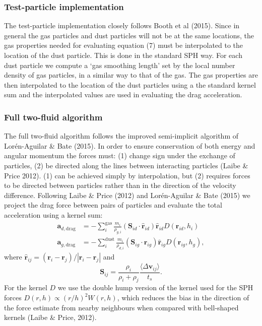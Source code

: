 \documentclass[a4paper]{article}
\renewcommand{\vec}[1]{\ensuremath{\mathbf{#1}}}
\begin{document}
\subsubsection{Test-particle implementation}

The test-particle implementation closely follows Booth et al (2015). Since in general the gas particles and dust particles will not be at the same locations, the gas properties needed for evaluating equation (7) must be interpolated to the location of the dust particle. This is done in the standard SPH way. For each dust particle we compute a `gas smoothing length' set by the local number density of gas particles, in a similar way to that of the gas. The gas properties are then interpolated to the location of the dust particles using a the standard kernel sum and the interpolated values are used in evaluating the drag acceleration.

\subsubsection{Full two-fluid algorithm}

The full two-fluid algorithm follows the improved semi-implicit algorithm of Lor\'en-Aguilar \& Bate (2015). In order to ensure conservation of both energy and angular momentum the forces must: (1) change sign under the exchange of particles, (2) be directed along the lines between interacting particles (Laibe \& Price 2012). (1) can be achieved simply by interpolation, but (2) requires forces to be directed between particles rather than in the direction of the velocity difference. Following Laibe \& Price (2012) and Lor\'en-Aguilar \& Bate (2015) we project the drag force between pairs of particles and evaluate the total acceleration using a kernel sum:
\begin{align*}
 \vec{a}_{d,\mathrm{drag}} &= - \sum_i^\mathrm{gas} \frac{m_i}{\rho_{g,i}} ( \vec{S}_{id}  \cdot \vec{\hat r}_{id}) \vec{\hat r}_{id} D(\vec{r}_{id}, h_i) \\
 \vec{a}_{g,\mathrm{drag}} &= - \sum_i^\mathrm{dust} \frac{m_i}{\rho_{d,i}} ( \vec{S}_{ig} \cdot \vec{\hat r}_{ig}) \vec{\hat r}_{ig} D(\vec{r}_{ig}, h_g),
\end{align*}
where $\vec{\hat r}_{ij} = (\vec{r}_i - \vec{r}_j) / |\vec{r}_i - \vec{r}_j|$ and 
\begin{equation}
 \vec{S}_{ij} = \frac{\rho_i}{\rho_i + \rho_j} \frac{\langle \Delta \vec{v}_{ij} \rangle}{t_s}.
\end{equation}
For the kernel $D$ we use the double hump version of the kernel used for the SPH forces $D(r,h) \propto (r/h)^2 W(r,h)$, which reduces the bias in the direction of the force estimate from nearby neighbours when compared with bell-shaped kernels (Laibe \& Price, 2012).
\end{document}
